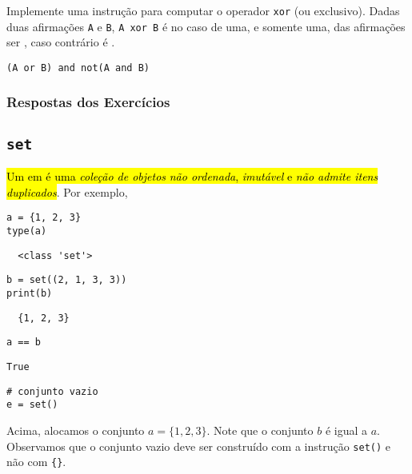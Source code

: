 \begin{exer}
  Implemente uma instrução para computar o operador \texttt{xor} (ou exclusivo). Dadas duas afirmações \texttt{A} e \texttt{B}, \texttt{A xor B} é {\PYTHONTrue} no caso de uma, e somente uma, das afirmações ser {\PYTHONFalse}, caso contrário é {\PYTHONFalse}.
\end{exer}
\begin{resp}
\texttt{(A or B) and not(A and B)}
\end{resp}

\ifisbook 
\subsubsection*{Respostas dos Exercícios}
\shipoutAnswer
\fi


\subsection{\texttt{set}}

\hl{Um {\PYTHONset} em {\python} é uma \emph{coleção de objetos} \emph{não ordenada}, \emph{imutável} e \emph{não admite itens duplicados}}. Por exemplo,

\begin{lstlisting}
a = {1, 2, 3}
type(a)  
\end{lstlisting}

\begin{verbatim}
  <class 'set'>
\end{verbatim}

\begin{lstlisting}
b = set((2, 1, 3, 3))
print(b)
\end{lstlisting}

\begin{verbatim}
  {1, 2, 3}
\end{verbatim}

\begin{lstlisting}
a == b
\end{lstlisting}

\begin{verbatim}
True
\end{verbatim}

\begin{lstlisting}
# conjunto vazio
e = set()  
\end{lstlisting}

Acima, alocamos o conjunto $a = \{1,2, 3\}$. Note que o conjunto $b$ é igual a $a$. Observamos que o conjunto vazio deve ser construído com a instrução \texttt{set()} e não com \texttt{\{\}}.

